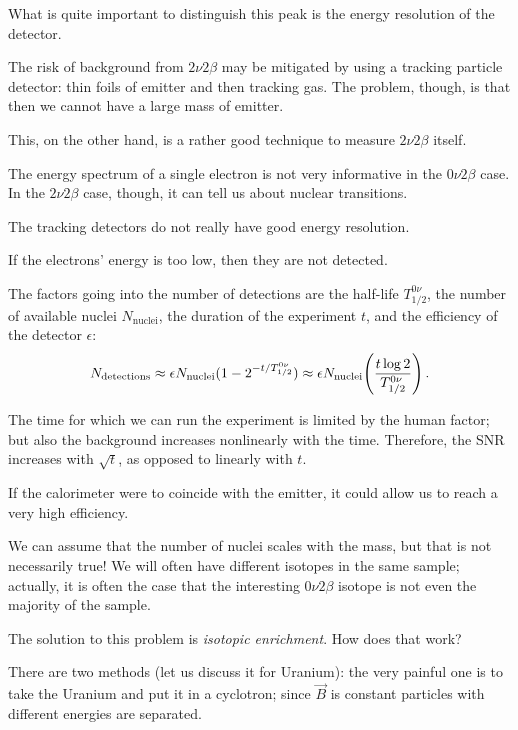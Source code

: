 \documentclass[main.tex]{subfiles}
\begin{document}
What is quite important to distinguish this peak is the energy resolution of the detector. 

The risk of background from \(2 \nu 2 \beta \) may be mitigated by using a tracking particle detector: thin foils of emitter and then tracking gas. 
The problem, though, is that then we cannot have a large
mass of emitter. 

This, on the other hand, is a rather good technique to measure \(2 \nu 2 \beta \) itself.

The energy spectrum of a single electron is not very informative in the \(0 \nu 2 \beta \) case.
In the \(2 \nu 2 \beta \) case, though, it can tell us about nuclear transitions. 

The tracking detectors do not really have good energy resolution. 

If the electrons' energy is too low, then they are not detected. 

The factors going into the number of detections are the half-life \(T^{0 \nu }_{1/2}\), the number of available nuclei \(N _{\text{nuclei}}\), the duration of the experiment \(t\), and the efficiency of the detector \(\epsilon \): 
%
\begin{align}
N _{\text{detections}} \approx \epsilon N _{\text{nuclei}} (1 - 2^{- t / T_{1/2}^{0 \nu }}) \approx \epsilon N _{\text{nuclei}} \qty( \frac{t \log 2}{T_{1/2}^{0 \nu }})
\,.
\end{align}

The time for which we can run the experiment is limited by the human factor; but also the background increases nonlinearly with the time. 
Therefore, the SNR increases with \(\sqrt{t}\), as opposed to linearly with \(t\). 

If the calorimeter were to coincide with the emitter, it could allow us to reach a very high efficiency. 

We can assume that the number of nuclei scales with the mass, but that is not necessarily true! 
We will often have different isotopes in the same sample; actually, it is often the case that the interesting \(0 \nu 2 \beta \) isotope is not even the majority of the sample. 

The solution to this problem is \emph{isotopic enrichment}. 
How does that work? 

There are two methods (let us discuss it for Uranium): the very painful one is to take the Uranium and put it in a cyclotron; since \(\vec{B}\) is constant particles with different energies are separated. 
\end{document}
